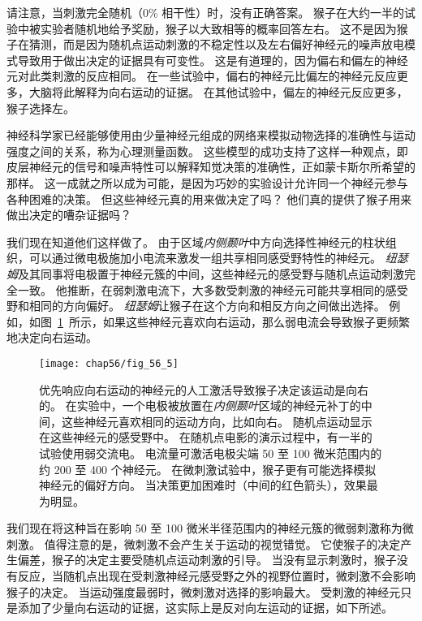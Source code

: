 请注意，当刺激完全随机（0\% 相干性）时，没有正确答案。
猴子在大约一半的试验中被实验者随机地给予奖励，猴子以大致相等的概率回答左右。
这不是因为猴子在猜测，而是因为随机点运动刺激的不稳定性以及左右偏好神经元的噪声放电模式导致用于做出决定的证据具有可变性。
这是有道理的，因为偏右和偏左的神经元对此类刺激的反应相同。
在一些试验中，偏右的神经元比偏左的神经元反应更多，大脑将此解释为向右运动的证据。
在其他试验中，偏左的神经元反应更多，猴子选择左。


神经科学家已经能够使用由少量神经元组成的网络来模拟动物选择的准确性与运动强度之间的关系，称为心理测量函数。
这些模型的成功支持了这样一种观点，即皮层神经元的信号和噪声特性可以解释知觉决策的准确性，正如蒙卡斯尔所希望的那样。
这一成就之所以成为可能，是因为巧妙的实验设计允许同一个神经元参与各种困难的决策。
但这些神经元真的用来做决定了吗？
他们真的提供了猴子用来做出决定的嘈杂证据吗？


我们现在知道他们这样做了。
由于区域\textit{内侧颞叶}中方向选择性神经元的柱状组织，可以通过微电极施加小电流来激发一组共享相同感受野特性的神经元。
\textit{纽瑟姆}及其同事将电极置于神经元簇的中间，这些神经元的感受野与随机点运动刺激完全一致。
他推断，在弱刺激电流下，大多数受刺激的神经元可能共享相同的感受野和相同的方向偏好。
\textit{纽瑟姆}让猴子在这个方向和相反方向之间做出选择。
例如，如图~\ref{fig:56_5}~所示，如果这些神经元喜欢向右运动，那么弱电流会导致猴子更频繁地决定向右运动。


\begin{figure}[htbp]
	\centering
	\texttt{[image: chap56/fig\_56\_5]}
	\caption{优先响应向右运动的神经元的人工激活导致猴子决定该运动是向右的。
		在实验中，一个电极被放置在\textit{内侧颞叶}区域的神经元补丁的中间，这些神经元喜欢相同的运动方向，比如向右。
		随机点运动显示在这些神经元的感受野中。
		在随机点电影的演示过程中，有一半的试验使用弱交流电。
		电流量可激活电极尖端 50 至 100 微米范围内的约 200 至 400 个神经元。
		在微刺激试验中，猴子更有可能选择模拟神经元的偏好方向。
		当决策更加困难时（中间的红色箭头），效果最为明显\cite{ditterich2003microstimulation}。}
	\label{fig:56_5}
\end{figure}


我们现在将这种旨在影响 50 至 100 微米半径范围内的神经元簇的微弱刺激称为微刺激。
值得注意的是，微刺激不会产生关于运动的视觉错觉。
它使猴子的决定产生偏差，猴子的决定主要受随机点运动刺激的引导。
当没有显示刺激时，猴子没有反应，当随机点出现在受刺激神经元感受野之外的视野位置时，微刺激不会影响猴子的决定。
当运动强度最弱时，微刺激对选择的影响最大。
受刺激的神经元只是添加了少量向右运动的证据，这实际上是反对向左运动的证据，如下所述。


